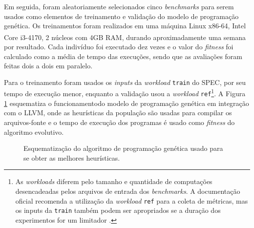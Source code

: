 \documentclass[
	12pt,				%
	openright,			%
	twoside,			%
	a4paper,			%
	tcc,			%
	]{ABNT-DC-UEL}
\begin{document}
Em seguida, foram aleatoriamente selecionados cinco \textit{benchmarks} para serem usados como elementos de treinamento e validação do modelo de programação genética. Os treinamentos foram realizados em uma máquina Linux x86-64, Intel Core\textsuperscript{\textregistered} i3-4170, 2 núcleos com 4GB RAM, durando aproximadamente uma semana por resultado. Cada indivíduo foi executado dez vezes e o valor do \textit{fitness} foi calculado como a média de tempo das execuções, sendo que as avaliações foram feitas dois a dois em paralelo. 

Para o treinamento foram usados os \textit{inputs} da \textit{workload} \texttt{train} do SPEC, por seu tempo de execução menor, enquanto a validação usou a \textit{workload} \texttt{ref}\footnote[1]{As \textit{workloads} diferem pelo tamanho e quantidade de computações desencadeadas pelos arquivos de entrada dos \textit{benchmarks}. A documentação oficial recomenda a utilização da \textit{workload} \texttt{ref} para a coleta de métricas, mas os inputs da \texttt{train} também podem ser apropriados se a duração dos experimentos for um limitador 
\cite{speccpu:01}.}. A Figura \ref{fig:esquema-algoritmo} esquematiza o funcionamentodo modelo de programação genética em integração com o LLVM, onde as heurísticas da população são usadas para compilar os arquivos-fonte e o tempo de execução dos programas é usado como \textit{fitness} do algoritmo evolutivo.

\begin{figure}[htb]
    \centering
    \caption{Esquematização do algoritmo de programação genética usado para se obter as melhores heurísticas.}
    \label{fig:esquema-algoritmo}
\end{figure}
\end{document}
